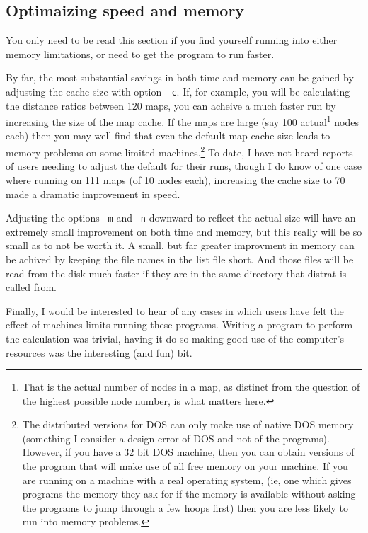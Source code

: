 \documentclass[%
	11pt,
        a4paper,
        twoside]{workrep}
\newcommand*{\prg}[1]{\textsf{#1}}		%
\newcommand*{\opt}[1]{\texttt{#1}}		%
\begin{document}
\subsection{Optimaizing speed and memory}\label{sec:dr:optomize}
You only need to be read this section if you find yourself running
into either memory limitations, or need to get the program to run
faster.

By far, the most substantial savings in both time and memory can be
gained by adjusting the cache size with option~\opt{-c}.  If, for example,
you will be calculating the distance ratios between 120 maps, you can
acheive a much faster run by increasing the size of the map cache.  If
the maps are large (say 100 actual\footnote{%
  That is the actual number of nodes in a map, as distinct from the
  question of the highest possible node number, is what matters here.}
 nodes each) then you may well find that
even the default map cache size leads to memory problems on some limited
machines.\footnote{%
  The distributed versions for DOS can only make use of native DOS
  memory (something I consider a design error of DOS and not of the
  programs).  However, if you have a 32 bit DOS machine, then you can
  obtain versions of the program that will make use of all free memory
  on your machine.  If you are running on a machine with a real operating
  system, (ie, one which gives programs the memory they ask for if
  the memory is available without asking the programs to jump through
  a few hoops first) then you are less likely to run into memory
  problems.}
To date, I have not heard reports of users needing to adjust the default
for their runs, though I do know of one case where running on
111 maps (of 10 nodes each), increasing the cache size to 70 made
a dramatic improvement in speed.

Adjusting the options \opt{-m} and \opt{-n} downward to reflect the
actual size will have an extremely small improvement on both time and
memory, but this really will be so small as to not be worth it.  A small,
but far greater improvment in memory can be achived by keeping the file
names in the list file short.  And those files will be read from the
disk much faster if they are in the same directory that \prg{distrat}
is called from.

Finally, I would be interested to hear of any cases in which users
have felt the effect of machines limits running these programs.  Writing
a program to perform the calculation was trivial, having it do so
making good use of the computer's resources was the interesting (and
fun) bit.
\end{document}
